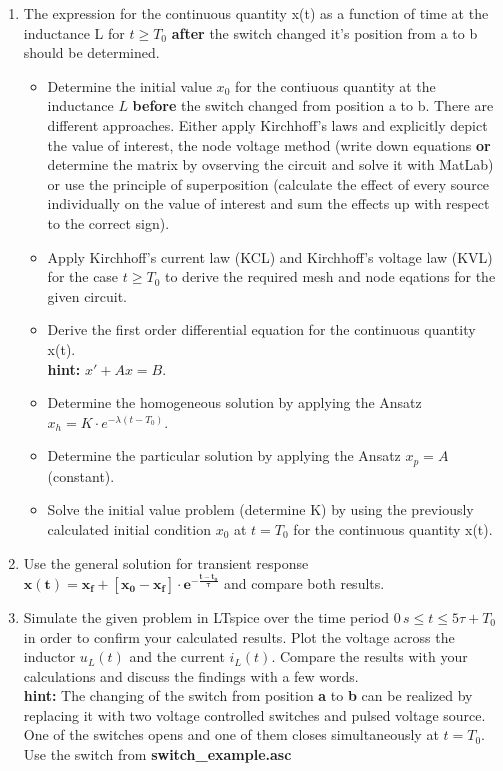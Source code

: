 \documentclass[a4paper]{article}
\begin{document}
	\begin{enumerate}
		
		\item The expression for the continuous quantity x(t) as a function of time at the inductance L for $t \geq T_0$ \textbf{after} the switch changed it's position from a to b should be determined. 
		
		\begin{itemize}
			\item Determine the initial value $x_0$ for the contiuous quantity at the inductance $L$ \textbf{before} the switch changed from position a to b. There are different approaches. Either apply Kirchhoff's laws and explicitly depict the value of interest, the node voltage method (write down equations \textbf{or} determine the matrix by ovserving the circuit and solve it with MatLab) or use the principle of superposition (calculate the effect of every source individually on the value of interest and sum the effects up with respect to the correct sign). 
			\item Apply Kirchhoff's current law (KCL) and Kirchhoff's voltage law (KVL)  for the case $t \geq T_0$ to derive the required mesh and node eqations for the given circuit.
			\item Derive the first order differential equation for the continuous quantity x(t). \\
				  \textbf{hint:} $x' + A x = B$.
			\item Determine the homogeneous solution by applying the Ansatz $x_h = K \cdot e^{-\lambda (t - T_0)}$.
			\item Determine the particular solution by applying the Ansatz $x_p = A$ (constant).
			\item Solve the initial value problem (determine K) by using the previously calculated initial condition $x_0$ at $t=T_0$ for the continuous quantity x(t).
		\end{itemize}
	
		\item Use the general solution for transient response $\mathbf{x(t) = x_f + [x_0 - x_f ] \cdot e^{-\frac{t-t_0}{\tau}}}$ and compare both results.
		
		\item Simulate the given problem in LTspice over the time period $0\,s \leq t \leq 5\tau + T_0$ in order to confirm your calculated results. Plot the voltage across the inductor $u_L(t)$ and the current $i_L(t)$. Compare the results with your calculations and discuss the findings with a few words.\\
		      \textbf{hint:} The changing of the switch from position \textbf{a} to \textbf{b} can be realized by replacing it with two voltage controlled switches and pulsed voltage source. One of the switches opens and one of them closes simultaneously at $t=T_0$. Use the switch from \textbf{switch\_example.asc}
		
	\end{enumerate}
\end{document}
